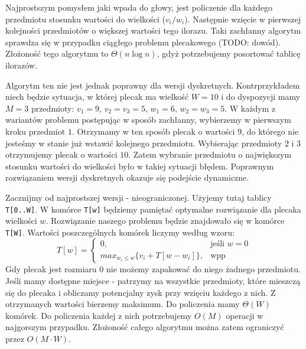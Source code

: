 Najprostszym pomysłem jaki wpada do głowy, jest policzenie dla każdego przedmiotu stosunku wartości do wielkości ($v_i / w_i$).
Następnie wzięcie w pierwszej kolejności przedmiotów o większej wartości tego ilorazu.
Taki zachłanny algorytm sprawdza się w przypadku ciągłego problemu plecakowego (TODO: dowód).
Złożoność tego algorytmu to $\Theta(n \log n)$, gdyż potrzebujemy posortować tablicę ilorazów.

Algorytm ten nie jest jednak poprawny dla wersji dyskretnych.
Kontrprzykładem niech będzie sytuacja, w której plecak ma wielkość $W = 10$ i do dyspozycji mamy $M = 3$ przedmioty: $v_1=9$, $v_2=v_3=5$, $w_1=6$, $w_2=w_3=5$.
W każdym z wariantów problemu postępując w sposób zachłanny, wybierzemy w pierwszym kroku przedmiot $1$.
Otrzymamy w ten sposób plecak o wartości $9$, do którego nie jesteśmy w stanie już wstawić kolejnego przedmiotu.
Wybierając przedmioty $2$ i $3$ otrzymujemy plecak o wartości $10$.
Zatem wybranie przedmiotu o największym stosunku wartości do wielkości było w takiej sytuacji błędem.
Poprawnym rozwiązaniem wersji dyskretnych okazuje się podejście dynamiczne.

Zacznijmy od najprostszej wersji - nieograniczonej.
Użyjemy tutaj tablicy \texttt{T[0..W]}.
W komórce \texttt{T[w]} będziemy pamiętać optymalne rozwiązanie dla plecaka wielkości $w$.
Rozwiązanie naszego problemu będzie znajdowało się w komórce \texttt{T[W]}.
Wartości poszczególnych komórek liczymy według wzoru:
\begin{equation*}
  T[w] = \begin{cases}
    0, & \text{jeśli $w = 0$}\\
    max_{w_i \leq w}\{v_i + T[w - w_i]\}, & \text{wpp}
  \end{cases}
\end{equation*}
Gdy plecak jest rozmiaru $0$ nie możemy zapakować do niego żadnego przedmiotu.
Jeśli mamy dostępne miejsce - patrzymy na wszystkie przedmioty, które mieszczą się do plecaka i obliczamy potencjalny zysk przy wzięciu każdego z nich.
Z otrzymanych wartości bierzemy maksimum.
Do policzenia mamy $\Theta(W)$ komórek.
Do policzenia każdej z nich potrzebujemy $O(M)$ operacji w najgorszym przypadku.
Złożoność całego algorytmu można zatem ograniczyć przez $O(M \cdot W)$.

